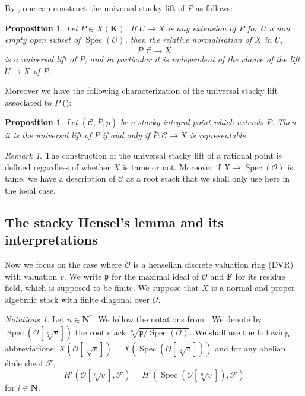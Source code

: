 \documentclass{proc-l}
\newcommand{\K}{\mathbf{K}}
\newcommand{\N}{\mathbf{N}}
\DeclareMathOperator{\Spec}{Spec}
\newcommand{\sheafO}{\mathcal{O}}
\newtheorem{prop}[theorem]{Proposition}
\theoremstyle{definition}
\theoremstyle{remark}
\newtheorem{remark}[theorem]{Remark}
\newtheorem{Notations}[theorem]{Notations}
\numberwithin{equation}{section}
\begin{document}
By \cite[proposition 2.5]{ellenberg2022heights}, one can construct the universal stacky lift of $P$ as follows:

\begin{prop}\label{prop_normalization_method_stacky_lift}
    Let $P \in X(\K)$. If $U \rightarrow X$ is any extension of $P$ for $U$ a non empty open subset of $\Spec(\sheafO)$, then the relative normalisation of $X$ in $U$, $$\bar{P} : \mathcal{C} \rightarrow X$$ is a universal lift of $P$, and in particular it is independent of the choice of the lift $U \rightarrow X$ of $P$.
\end{prop}

Moreover we have the following characterization of the universal stacky lift associated to $P$ (\cite[corollary 2.6]{ellenberg2022heights}):

\begin{prop}\label{proposition_carac_universal_stacky_lift_representability}
    Let $(\mathcal{C},\bar{P},p)$ be a stacky integral point which extends $P$. Then it is the universal lift of $P$ if and only if $\bar{P} : \mathcal{C} \rightarrow X$ is representable.
\end{prop}

\begin{remark}
    The construction of the universal stacky lift of a rational point is defined regardless of whether $X$ is tame or not. Moreover if $X \rightarrow \Spec(\sheafO)$ is tame, we have a description of $\mathcal{C}$ as a root stack that we shall only use here in the local case.
\end{remark}



\subsection{The stacky Hensel's lemma and its interpretations}

Now we focus on the case where $\sheafO$ is a henselian discrete valuation ring (DVR) with valuation $v$. We write $\mathfrak{p}$ for the maximal ideal of $\sheafO$ and $\mathbf{F}$ for its residue field, which is supposed to be finite. We suppose that $X$ is a normal and proper algebraic stack with finite diagonal over $\sheafO$.

\begin{Notations}
    Let $n \in \N^*$. We follow the notations from \cite[Section 4]{loughran_santens_malle_conjecture}. We denote by $\Spec(\sheafO[\sqrt[n]{v}])$ the root stack $\sqrt[n]{\mathfrak{p} / \Spec(\sheafO)}$. We shall use the following abbreviations: $X(\sheafO[\sqrt[n]{v}]) = X(\Spec(\sheafO[\sqrt[n]{v}]))$ and for any abelian étale sheaf $\mathcal{F}$, $$H^i(\sheafO[\sqrt[n]{v}],\mathcal{F}) = H^i(\Spec(\sheafO[\sqrt[n]{v}]),\mathcal{F})$$ for $i \in \N$.
\end{Notations}
\end{document}
